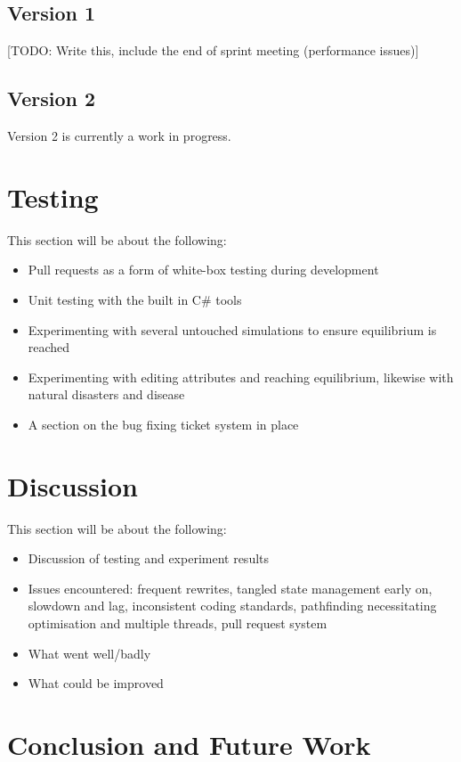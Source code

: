 \documentclass[a4paper, oneside, 11pt]{report}
\begin{document}
\section{Version 1}
[TODO: Write this, include the end of sprint meeting (performance issues)]

\section{Version 2}
Version 2 is currently a work in progress.

\chapter{Testing}\label{testing}

This section will be about the following:
\begin{itemize}
	\itemsep0em
	\item Pull requests as a form of white-box testing during development
	\item Unit testing with the built in C\# tools
	\item Experimenting with several untouched simulations to ensure equilibrium is reached 
	\item Experimenting with editing attributes and reaching equilibrium, likewise with natural disasters and disease
	\item A section on the bug fixing ticket system in place \label{bugfixing}
\end{itemize} 

\chapter{Discussion}\label{discussion}

This section will be about the following:
\begin{itemize}
	\itemsep0em
	\item Discussion of testing and experiment results
	\item Issues encountered: frequent rewrites, tangled state management early on, slowdown and lag, inconsistent coding standards, pathfinding necessitating optimisation and multiple threads, pull request system 
	\item What went well/badly
	\item What could be improved
\end{itemize} 

\chapter{Conclusion and Future Work}\label{conclusion}
\end{document}
